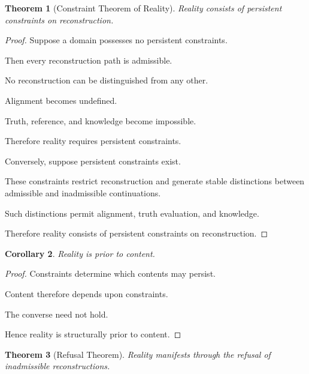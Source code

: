 \documentclass[12pt,oneside]{article}
\newtheorem{theorem}{Theorem}[section] \newtheorem{lemma}[theorem]{Lemma} \newtheorem{proposition}[theorem]{Proposition} \newtheorem{corollary}[theorem]{Corollary}
\theoremstyle{definition}
\begin{document}
\begin{theorem}[Constraint Theorem of Reality]

Reality consists of persistent constraints on reconstruction.

\end{theorem}

\begin{proof}

Suppose a domain possesses no persistent constraints.

Then every reconstruction path is admissible.

No reconstruction can be distinguished from any other.

Alignment becomes undefined.

Truth, reference, and knowledge become impossible.

Therefore reality requires persistent constraints.

Conversely, suppose persistent constraints exist.

These constraints restrict reconstruction and generate stable distinctions between admissible and inadmissible continuations.

Such distinctions permit alignment, truth evaluation, and knowledge.

Therefore reality consists of persistent constraints on reconstruction.

\end{proof}

\begin{corollary}

Reality is prior to content.

\end{corollary}

\begin{proof}

Constraints determine which contents may persist.

Content therefore depends upon constraints.

The converse need not hold.

Hence reality is structurally prior to content.

\end{proof}

\begin{theorem}[Refusal Theorem]

Reality manifests through the refusal of inadmissible reconstructions.

\end{theorem}
\end{document}

